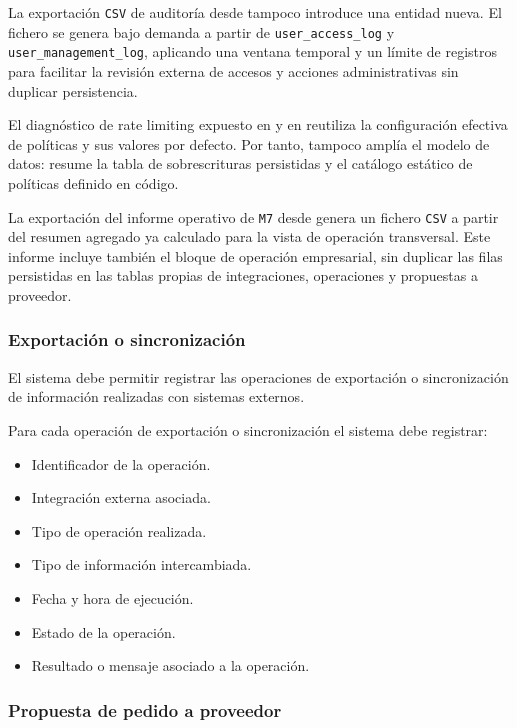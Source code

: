 La exportación \texttt{CSV} de auditoría desde  tampoco introduce una entidad nueva. El fichero se genera bajo demanda a partir de \texttt{user\_access\_log} y \texttt{user\_management\_log}, aplicando una ventana temporal y un límite de registros para facilitar la revisión externa de accesos y acciones administrativas sin duplicar persistencia.

El diagnóstico de rate limiting expuesto en  y en  reutiliza la configuración efectiva de políticas y sus valores por defecto. Por tanto, tampoco amplía el modelo de datos: resume la tabla de sobrescrituras persistidas y el catálogo estático de políticas definido en código.

La exportación del informe operativo de \texttt{M7} desde  genera un fichero \texttt{CSV} a partir del resumen agregado ya calculado para la vista de operación transversal. Este informe incluye también el bloque de operación empresarial, sin duplicar las filas persistidas en las tablas propias de integraciones, operaciones y propuestas a proveedor.

\subsubsection*{Exportación o sincronización}

El sistema debe permitir registrar las operaciones de exportación o sincronización de información realizadas con sistemas externos.

Para cada operación de exportación o sincronización el sistema debe registrar:

\begin{itemize}
    \item Identificador de la operación.
    \item Integración externa asociada.
    \item Tipo de operación realizada.
    \item Tipo de información intercambiada.
    \item Fecha y hora de ejecución.
    \item Estado de la operación.
    \item Resultado o mensaje asociado a la operación.
\end{itemize}

\subsubsection*{Propuesta de pedido a proveedor}

